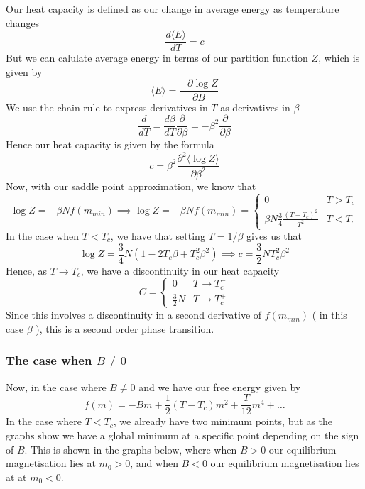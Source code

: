 Our heat capacity is defined as our change in average energy as temperature changes
\[ 
\frac{ d \langle E \rangle }{ dT}  = c
\] 
But we can calulate average energy in terms of our partition function $Z$, which is given by 
\[ 
\langle E \rangle = \frac{ - \partial \log Z }{ \partial B} 
\] 
We use the chain rule to express derivatives in $T$ as derivatives in $\beta$
\[ 
\frac{d}{ dT} = \frac{ d \beta} { dT } \frac{ \partial }{ \partial \beta} =  - \beta^ 2 \frac{ \partial }{ \partial \beta} 
\] 
Hence our heat capacity is given by the formula 
\[ 
c = \beta^2 \frac{ \partial^2 \langle \log Z \rangle}{ \partial \beta^2 } \] 
Now, with our saddle point approximation, we know that 
\[ 
\log Z = - \beta N f(m_{min} ) \implies \log Z =  - \beta N f(m_{min}) = \begin{cases} 
0 & T > T_c \\
\beta N \frac{ 3}{ 4} \frac{ ( T - T_c)^2 }{ T^2 }  & T < T_c 
\end{cases} 
\]  
In the case when $ T < T_c $, we have that setting $T = 1 / \beta $ gives us that 
\[ 
\log Z = \frac{ 3}{ 4} N ( 1 - 2 T_c \beta + T_c^2 \beta^2 ) \implies c = \frac{3}{ 2} N T_c^2 \beta^2 
\] 
Hence, as $T \rightarrow T_c$, we have a discontinuity in our heat capacity \[ 
C = \begin{cases} 
0 & T \rightarrow T_c^- \\
\frac{3}{2} N & T \rightarrow T_c^+ 
\end{cases} 
\] 
Since this involves a discontinuity in a second derivative of $f(m_{min})$ ( in this case $\beta$ ), this is a second order phase transition. 


\subsubsection*{The case when $B \neq 0 $} 
Now, in the case where $B \neq 0$ and we have our free energy given by 
\[ 
f(m) =  - Bm + \frac{1}{ 2}( T - T_c )m^2 + \frac{T}{ 12} m^4 + \dots \] 
In the case where $T < T_c$, we already have two minimum points, but as the graphs show we have a global minimum at a specific point depending on the sign of $B$. This is shown in the graphs below, where when $B>0$ our equilibrium magnetisation lies at $m_0 > 0$, and when $ B < 0 $ our equilibrium magnetisation lies at at $m_0 < 0$. 

